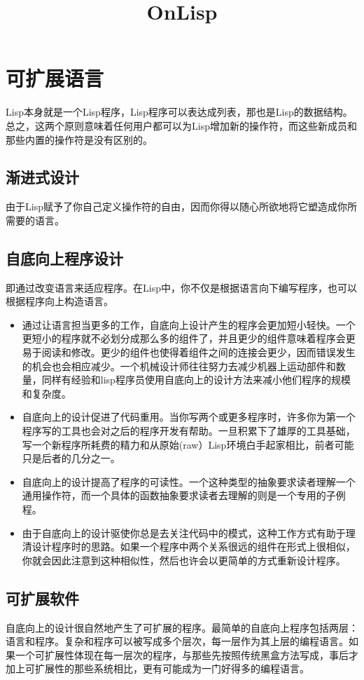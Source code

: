 \documentclass{ctexart}
\date{}
\title{OnLisp}
\begin{document}
\maketitle
\tableofcontents


\section{可扩展语言}
\label{sec-1}
Lisp本身就是一个Lisp程序，Lisp程序可以表达成列表，那也是Lisp的数据结构。总之，这两个原则意味着任何用户都可以为Lisp增加新的操作符，而这些新成员和那些内置的操作符是没有区别的。
\subsection{渐进式设计}
\label{sec-1-1}
由于Lisp赋予了你自己定义操作符的自由，因而你得以随心所欲地将它塑造成你所需要的语言。
\subsection{自底向上程序设计}
\label{sec-1-2}
即通过改变语言来适应程序。在Lisp中，你不仅是根据语言向下编写程序，也可以根据程序向上构造语言。
\begin{itemize}
\item 通过让语言担当更多的工作，自底向上设计产生的程序会更加短小轻快。一个更短小的程序就不必划分成那么多的组件了，并且更少的组件意味着程序会更易于阅读和修改。更少的组件也使得着组件之间的连接会更少，因而错误发生的机会也会相应减少。一个机械设计师往往努力去减少机器上运动部件和数量，同样有经验和lisp程序员使用自底向上的设计方法来减小他们程序的规模和复杂度。
\item 自底向上的设计促进了代码重用。当你写两个或更多程序时，许多你为第一个程序写的工具也会对之后的程序开发有帮助。一旦积累下了雄厚的工具基础，写一个新程序所耗费的精力和从原始(raw）Lisp环境白手起家相比，前者可能只是后者的几分之一。
\item 自底向上的设计提高了程序的可读性。一个这种类型的抽象要求读者理解一个通用操作符，而一个具体的函数抽象要求读者去理解的则是一个专用的子例程。
\item 由于自底向上的设计驱使你总是去关注代码中的模式，这种工作方式有助于理清设计程序时的思路。如果一个程序中两个关系很远的组件在形式上很相似，你就会因此注意到这种相似性，然后也许会以更简单的方式重新设计程序。
\end{itemize}
\subsection{可扩展软件}
\label{sec-1-3}
自底向上的设计很自然地产生了可扩展的程序。最简单的自底向上程序包括两层：语言和程序。复杂和程序可以被写成多个层次，每一层作为其上层的编程语言。如果一个可扩展性体现在每一层次的程序，与那些先按照传统黑盒方法写成，事后才加上可扩展性的那些系统相比，更有可能成为一门好得多的编程语言。
\end{document}
